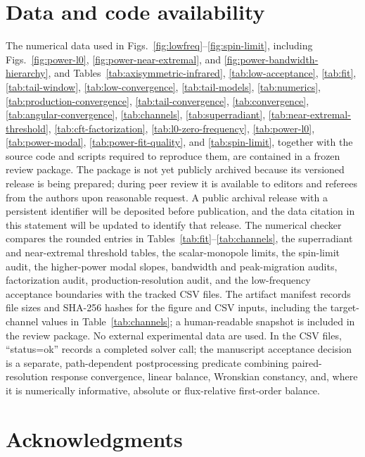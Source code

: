 \documentclass[aps,prd,twocolumn,10pt,nofootinbib,superscriptaddress,floatfix]{revtex4-2}
\begin{document}
\section*{Data and code availability}

The numerical data used in Figs.~\ref{fig:lowfreq}--\ref{fig:spin-limit},
including Figs.~\ref{fig:power-l0}, \ref{fig:power-near-extremal}, and
\ref{fig:power-bandwidth-hierarchy}, and
Tables~\ref{tab:axisymmetric-infrared}, \ref{tab:low-acceptance},
\ref{tab:fit}, \ref{tab:tail-window},
\ref{tab:low-convergence}, \ref{tab:tail-models}, \ref{tab:numerics}, \ref{tab:production-convergence},
\ref{tab:tail-convergence}, \ref{tab:convergence},
\ref{tab:angular-convergence}, \ref{tab:channels}, \ref{tab:superradiant},
\ref{tab:near-extremal-threshold}, \ref{tab:cft-factorization},
\ref{tab:l0-zero-frequency}, \ref{tab:power-l0}, \ref{tab:power-modal},
\ref{tab:power-fit-quality}, and \ref{tab:spin-limit}, together with the source code and scripts required to
reproduce them, are contained in a frozen review package.  The package is not
yet publicly archived because its versioned release is being prepared; during
peer review it is available to editors and referees from the authors upon
reasonable request.  A public archival release with a persistent identifier
will be deposited before publication, and the data citation in this statement
will be updated to identify that release.  The numerical checker compares the rounded entries in
Tables~\ref{tab:fit}--\ref{tab:channels}, the superradiant and near-extremal
threshold tables, the scalar-monopole limits, the spin-limit audit,
the higher-power modal slopes, bandwidth and peak-migration audits,
factorization audit, production-resolution audit, and
the low-frequency acceptance boundaries with the tracked CSV
files.  The artifact
manifest records file sizes and SHA-256 hashes for the figure and CSV inputs,
including the target-channel values in Table~\ref{tab:channels}; a human-readable
snapshot is included in the review package.  No external experimental data are
used.  In the CSV files, ``status=ok'' records a completed solver call; the
manuscript acceptance decision is a separate, path-dependent postprocessing
predicate combining paired-resolution response convergence, linear balance,
Wronskian constancy, and, where it is numerically informative, absolute or
flux-relative first-order balance.

\section*{Acknowledgments}
\end{document}
